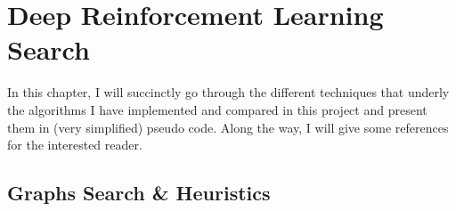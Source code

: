 
\chapter{Deep Reinforcement Learning Search} %

\label{Chapter1} %

In this chapter, I will succinctly go through the different techniques that underly the algorithms I have implemented and compared in this project and present them in (very simplified) pseudo code. Along the way, I will give some references for the interested reader.



\section{Graphs Search \& Heuristics}

\label{GSH}


